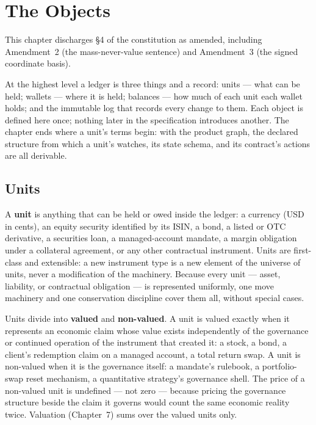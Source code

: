 \section{The Objects}\label{ch:objects}

This chapter discharges \S 4 of the constitution as amended, including Amendment~2 (the
mass-never-value sentence) and Amendment~3 (the signed coordinate basis).

At the highest level a ledger is three things and a record: units --- what can be held;
wallets --- where it is held; balances --- how much of each unit each wallet holds; and
the immutable log that records every change to them. Each object is defined here once;
nothing later in the specification introduces another. The chapter ends where a unit's
terms begin: with the product graph, the declared structure from which a unit's watches,
its state schema, and its contract's actions are all derivable.

\subsection{Units}

A \textbf{unit} is anything that can be held or owed inside the ledger: a currency (USD
in cents), an equity security identified by its ISIN, a bond, a listed or OTC derivative,
a securities loan, a managed-account mandate, a margin obligation under a collateral
agreement, or any other contractual instrument. Units are first-class and extensible: a
new instrument type is a new element of the universe of units, never a modification of
the machinery. Because every unit --- asset, liability, or contractual obligation --- is
represented uniformly, one move machinery and one conservation discipline cover them all,
without special cases.

Units divide into \textbf{valued} and \textbf{non-valued}. A unit is valued exactly when
it represents an economic claim whose value exists independently of the governance or
continued operation of the instrument that created it: a stock, a bond, a client's
redemption claim on a managed account, a total return swap. A unit is non-valued when it
is the governance itself: a mandate's rulebook, a portfolio-swap reset mechanism, a
quantitative strategy's governance shell. The price of a non-valued unit is undefined ---
not zero --- because pricing the governance structure beside the claim it governs would
count the same economic reality twice. Valuation (Chapter~7) sums over the valued units
only.

